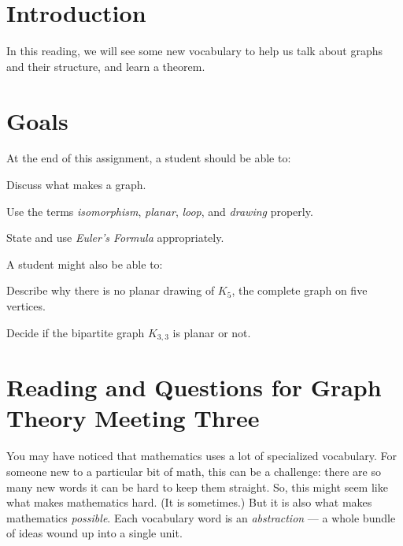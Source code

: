 \documentclass[12pt,letterpaper]{article}
\theoremstyle{definition}
\begin{document}
\setlength{\parskip}{1ex plus 0.5ex minus 0.2ex}
\setlength{\parindent}{0pt}

\pagestyle{fancy}
\cfoot{}

\section*{Introduction}

In this reading, we will see some new vocabulary to help us talk about graphs and their structure, and learn a theorem.

\section*{Goals}
At the end of this assignment, a student should be able to:
\begin{compactitem}
\item Discuss what makes a graph.
\item Use the terms \emph{isomorphism}, \emph{planar}, \emph{loop}, and \emph{drawing} properly.
\item State and use \emph{Euler's Formula} appropriately.
\end{compactitem}
A student might also be able to:
\begin{compactitem}
\item Describe why there is no planar drawing of $K_5$, the complete graph on five vertices.
\item Decide if the bipartite graph $K_{3,3}$ is planar or not.
\end{compactitem}

\section*{Reading and Questions for Graph Theory Meeting Three}

You may have noticed that mathematics uses a lot of specialized vocabulary.
For someone new to a particular bit of math, this can be a challenge: there are so many new words
it can be hard to keep them straight.
So, this might seem like what makes mathematics hard. (It is sometimes.)
But it is also what makes mathematics \emph{possible}. 
Each vocabulary word is an \emph{abstraction} --- a whole bundle of ideas wound up into a single unit.
\end{document}

